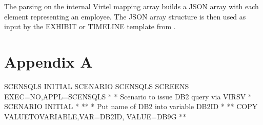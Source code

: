 \documentclass[letterpaper,10pt,english]{sphinxmanual}
\begin{document}
The parsing on the internal Virtel mapping array builds a JSON array with each element representing an employee. The JSON array structure is then used as input by the EXHIBIT or TIMELINE template from .


\chapter{Appendix A}
\label{\detokenize{TN201906:appendix-a}}

\begin{sphinxVerbatim}[commandchars=\\\{\}]
SCENSQLS INITIAL SCENARIO
SCENSQLS SCREENS EXEC=NO,APPL=SCENSQLS
*
* Scenario to issue DB2 query via VIRSV
*
   SCENARIO INITIAL
*
*\PYGZhy{}\PYGZhy{}\PYGZhy{}\PYGZhy{}\PYGZhy{}\PYGZhy{}\PYGZhy{}\PYGZhy{}\PYGZhy{}\PYGZhy{}\PYGZhy{}\PYGZhy{}\PYGZhy{}\PYGZhy{}\PYGZhy{}\PYGZhy{}\PYGZhy{}\PYGZhy{}\PYGZhy{}\PYGZhy{}\PYGZhy{}\PYGZhy{}\PYGZhy{}\PYGZhy{}\PYGZhy{}\PYGZhy{}\PYGZhy{}\PYGZhy{}\PYGZhy{}\PYGZhy{}\PYGZhy{}\PYGZhy{}\PYGZhy{}\PYGZhy{}\PYGZhy{}\PYGZhy{}\PYGZhy{}\PYGZhy{}\PYGZhy{}\PYGZhy{}\PYGZhy{}\PYGZhy{}\PYGZhy{}\PYGZhy{}\PYGZhy{}\PYGZhy{}\PYGZhy{}\PYGZhy{}\PYGZhy{}\PYGZhy{}\PYGZhy{}\PYGZhy{}\PYGZhy{}\PYGZhy{}\PYGZhy{}\PYGZhy{}\PYGZhy{}\PYGZhy{}\PYGZhy{}\PYGZhy{}\PYGZhy{}\PYGZhy{}\PYGZhy{}\PYGZhy{}\PYGZhy{}\PYGZhy{}\PYGZhy{}\PYGZhy{}\PYGZhy{}*
* Put name of DB2 into variable DB2ID                                 *
*\PYGZhy{}\PYGZhy{}\PYGZhy{}\PYGZhy{}\PYGZhy{}\PYGZhy{}\PYGZhy{}\PYGZhy{}\PYGZhy{}\PYGZhy{}\PYGZhy{}\PYGZhy{}\PYGZhy{}\PYGZhy{}\PYGZhy{}\PYGZhy{}\PYGZhy{}\PYGZhy{}\PYGZhy{}\PYGZhy{}\PYGZhy{}\PYGZhy{}\PYGZhy{}\PYGZhy{}\PYGZhy{}\PYGZhy{}\PYGZhy{}\PYGZhy{}\PYGZhy{}\PYGZhy{}\PYGZhy{}\PYGZhy{}\PYGZhy{}\PYGZhy{}\PYGZhy{}\PYGZhy{}\PYGZhy{}\PYGZhy{}\PYGZhy{}\PYGZhy{}\PYGZhy{}\PYGZhy{}\PYGZhy{}\PYGZhy{}\PYGZhy{}\PYGZhy{}\PYGZhy{}\PYGZhy{}\PYGZhy{}\PYGZhy{}\PYGZhy{}\PYGZhy{}\PYGZhy{}\PYGZhy{}\PYGZhy{}\PYGZhy{}\PYGZhy{}\PYGZhy{}\PYGZhy{}\PYGZhy{}\PYGZhy{}\PYGZhy{}\PYGZhy{}\PYGZhy{}\PYGZhy{}\PYGZhy{}\PYGZhy{}\PYGZhy{}\PYGZhy{}*
   COPY\PYGZdl{} VALUE\PYGZhy{}TO\PYGZhy{}VARIABLE,VAR=\PYGZsq{}DB2ID\PYGZsq{},                          \PYGZhy{}
         VALUE=\PYGZsq{}DB9G\PYGZsq{}
*\PYGZhy{}\PYGZhy{}\PYGZhy{}\PYGZhy{}\PYGZhy{}\PYGZhy{}\PYGZhy{}\PYGZhy{}\PYGZhy{}\PYGZhy{}\PYGZhy{}\PYGZhy{}\PYGZhy{}\PYGZhy{}\PYGZhy{}\PYGZhy{}\PYGZhy{}\PYGZhy{}\PYGZhy{}\PYGZhy{}\PYGZhy{}\PYGZhy{}\PYGZhy{}\PYGZhy{}\PYGZhy{}\PYGZhy{}\PYGZhy{}\PYGZhy{}\PYGZhy{}\PYGZhy{}\PYGZhy{}\PYGZhy{}\PYGZhy{}\PYGZhy{}\PYGZhy{}\PYGZhy{}\PYGZhy{}\PYGZhy{}\PYGZhy{}\PYGZhy{}\PYGZhy{}\PYGZhy{}\PYGZhy{}\PYGZhy{}\PYGZhy{}\PYGZhy{}\PYGZhy{}\PYGZhy{}\PYGZhy{}\PYGZhy{}\PYGZhy{}\PYGZhy{}\PYGZhy{}\PYGZhy{}\PYGZhy{}\PYGZhy{}\PYGZhy{}\PYGZhy{}\PYGZhy{}\PYGZhy{}\PYGZhy{}\PYGZhy{}\PYGZhy{}\PYGZhy{}\PYGZhy{}\PYGZhy{}\PYGZhy{}\PYGZhy{}\PYGZhy{}*

\end{sphinxVerbatim}
\end{document}
